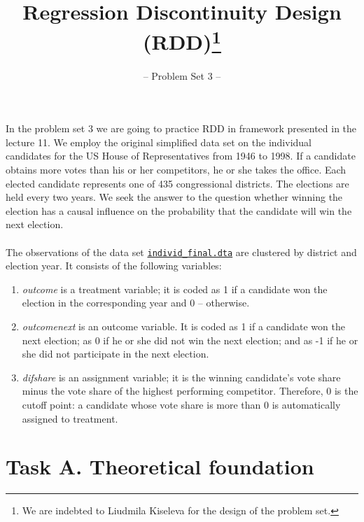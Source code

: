 

\title{Regression Discontinuity Design (RDD)\thanks{We are indebted to Liudmila Kiseleva for the design of the problem set.}}
\subtitle{-- Problem Set 3 --}
\date{}

\maketitle\vspace{-2cm}

In the problem set 3 we are going to practice RDD in \cite{Lee.2008} framework presented in the lecture 11. We employ the original simplified data set on the individual candidates for the US House of Representatives from 1946 to 1998. If a candidate obtains more votes than his or her competitors, he or she takes the office.  Each elected candidate represents one of 435 congressional districts. The elections are held every two years. We seek the answer to the question whether winning the election has a causal influence on the probability that the candidate will win the next election.\\
\\
The observations of the data set \href{https://github.com/HumanCapitalAnalysis/microeconometrics/tree/master/problem-sets/03-regression-discontinuity-design/data}{\texttt{individ\_final.dta}} are clustered by district and election year. It consists of the following variables:
\begin{enumerate}

\item \emph{outcome} is a treatment variable; it is coded as 1 if a candidate won the election in the corresponding year and 0 -- otherwise.
\item \emph{outcomenext} is an outcome variable. It is coded as 1 if a candidate won the next election; as 0 if he or she did not win the next election; and as -1 if he or she did not participate in the next election.
\item \emph{difshare} is an assignment variable; it is the winning candidate's vote share minus the vote share of the highest performing competitor. Therefore, 0 is the cutoff point: a candidate whose vote share is more than 0 is automatically assigned to treatment.

\end {enumerate}

\section*{Task A. Theoretical foundation}

